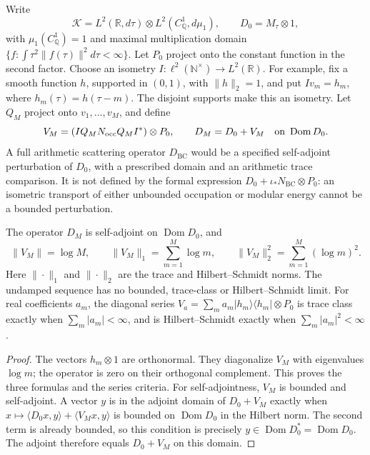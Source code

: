 \begin{definition}
\label{v4-arith:w7-j:def:scattering-space}
Write
\begin{equation}
\label{v4-arith:w7-j:eq:H-scatter}
 \mathcal K=L^2(\mathbb R,d\tau)\otimes L^2(C_{\mathbb Q}^1,d\mu_1),
 \qquad D_0=M_\tau\otimes1,
\end{equation}
with \(\mu_1(C_{\mathbb Q}^1)=1\) and maximal multiplication domain
\(\{f:\int\tau^2\|f(\tau)\|^2d\tau<\infty\}\).
Let \(P_0\) project onto the constant function in the second factor.
Choose an isometry \(I:\ell^2(\mathbb N^\times)\to L^2(\mathbb R)\).
For example, fix a smooth function \(h\), supported in \((0,1)\), with
\(\|h\|_2=1\), and put \(Iv_m=h_m\), where \(h_m(\tau)=h(\tau-m)\).
The disjoint supports make this an isometry. Let \(Q_M\) project onto
\(v_1,\ldots,v_M\), and define
\begin{equation}
\label{v4-arith:w7-j:eq:D-BC}
 V_M=(I Q_MN_{\mathrm{occ}}Q_MI^*)\otimes P_0,
 \qquad D_M=D_0+V_M \quad\hbox{on }\operatorname{Dom}D_0.
\end{equation}
A full arithmetic scattering operator \(D_{\mathrm{BC}}\) would be a
specified self-adjoint perturbation of \(D_0\), with a prescribed domain
and an arithmetic trace comparison. It is not defined by the formal
expression \(D_0+\iota_*N_{\mathrm{BC}}\otimes P_0\): an isometric
transport of either unbounded occupation or modular energy cannot be a
bounded perturbation.
\end{definition}

\begin{proposition}
\label{v4-arith:w7-j:finite-perturbation}
The operator \(D_M\) is self-adjoint on \(\operatorname{Dom}D_0\), and
\[
 \|V_M\|=\log M,\qquad
 \|V_M\|_1=\sum_{m=1}^M\log m,\qquad
 \|V_M\|_2^2=\sum_{m=1}^M(\log m)^2.
\]
Here \(\|\cdot\|_1\) and \(\|\cdot\|_2\) are the trace and
Hilbert--Schmidt norms. The undamped sequence has no bounded,
trace-class or Hilbert--Schmidt limit. For real coefficients \(a_m\),
the diagonal series
\(V_a=\sum_m a_m|h_m\rangle\langle h_m|\otimes P_0\)
is trace class exactly when \(\sum_m|a_m|<\infty\), and is
Hilbert--Schmidt exactly when \(\sum_m|a_m|^2<\infty\).
\end{proposition}
\begin{proof}
The vectors \(h_m\otimes1\) are orthonormal. They diagonalize \(V_M\)
with eigenvalues \(\log m\); the operator is zero on their orthogonal
complement. This proves the three formulas and the series criteria.
For self-adjointness, \(V_M\) is bounded and self-adjoint. A vector
\(y\) is in the adjoint domain of \(D_0+V_M\) exactly when
\(x\mapsto\langle D_0x,y\rangle+\langle V_Mx,y\rangle\) is bounded
on \(\operatorname{Dom}D_0\) in the Hilbert norm. The second term is
already bounded, so this condition is precisely
\(y\in\operatorname{Dom}D_0^*=\operatorname{Dom}D_0\). The adjoint
therefore equals \(D_0+V_M\) on this domain.
\end{proof}

